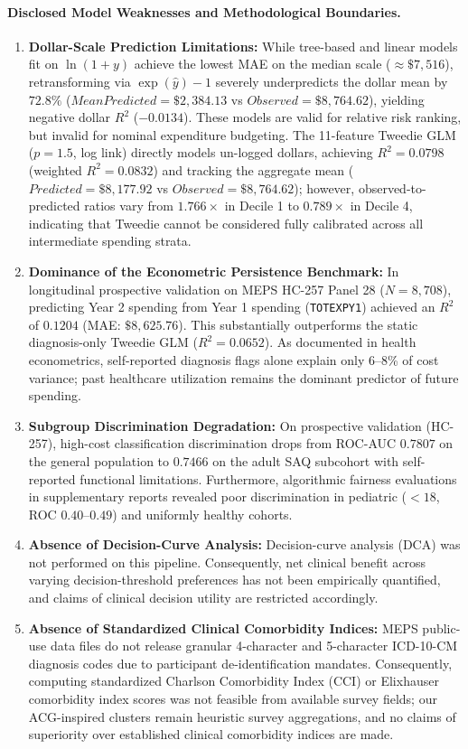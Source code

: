 \documentclass[runningheads]{llncs}
\begin{document}
\paragraph{Disclosed Model Weaknesses and Methodological Boundaries.}
\begin{enumerate}
    \item \textbf{Dollar-Scale Prediction Limitations:} While tree-based and linear models fit on $\ln(1+y)$ achieve the lowest MAE on the median scale ($\approx \$7,516$), retransforming via $\exp(\hat{y})-1$ severely underpredicts the dollar mean by $72.8\%$ ($Mean Predicted = \$2,384.13$ vs $Observed = \$8,764.62$), yielding negative dollar $R^2$ ($-0.0134$). These models are valid for relative risk ranking, but invalid for nominal expenditure budgeting. The 11-feature Tweedie GLM ($p=1.5$, log link) directly models un-logged dollars, achieving $R^2 = 0.0798$ (weighted $R^2 = 0.0832$) and tracking the aggregate mean ($Predicted = \$8,177.92$ vs $Observed = \$8,764.62$); however, observed-to-predicted ratios vary from $1.766\times$ in Decile 1 to $0.789\times$ in Decile 4, indicating that Tweedie cannot be considered fully calibrated across all intermediate spending strata.
    \item \textbf{Dominance of the Econometric Persistence Benchmark:} In longitudinal prospective validation on MEPS HC-257 Panel 28 ($N=8,708$), predicting Year 2 spending from Year 1 spending (\texttt{TOTEXPY1}) achieved an $R^2$ of \textbf{$0.1204$} (MAE: $\$8,625.76$). This substantially outperforms the static diagnosis-only Tweedie GLM ($R^2 = 0.0652$). As documented in health econometrics, self-reported diagnosis flags alone explain only 6--8\% of cost variance; past healthcare utilization remains the dominant predictor of future spending.
    \item \textbf{Subgroup Discrimination Degradation:} On prospective validation (HC-257), high-cost classification discrimination drops from ROC-AUC $0.7807$ on the general population to \textbf{$0.7466$} on the adult SAQ subcohort with self-reported functional limitations. Furthermore, algorithmic fairness evaluations in supplementary reports revealed poor discrimination in pediatric ($<18$, ROC $0.40$--$0.49$) and uniformly healthy cohorts.
    \item \textbf{Absence of Decision-Curve Analysis:} Decision-curve analysis (DCA) was not performed on this pipeline. Consequently, net clinical benefit across varying decision-threshold preferences has not been empirically quantified, and claims of clinical decision utility are restricted accordingly.
    \item \textbf{Absence of Standardized Clinical Comorbidity Indices:} MEPS public-use data files do not release granular 4-character and 5-character ICD-10-CM diagnosis codes due to participant de-identification mandates. Consequently, computing standardized Charlson Comorbidity Index (CCI) or Elixhauser comorbidity index scores was not feasible from available survey fields; our ACG-inspired clusters remain heuristic survey aggregations, and no claims of superiority over established clinical comorbidity indices are made.
\end{enumerate}
\end{document}
